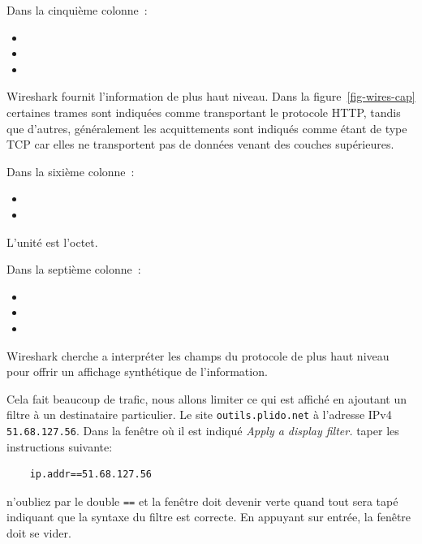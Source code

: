 {Dans la cinquième colonne~:
 \begin{itemize}[label=$\circ$]
   \item {}
   \item {}
   \item {}
  \end{itemize}
}
{
Wireshark fournit l'information de plus haut niveau. Dans la figure~\vref{fig-wires-cap} certaines trames sont indiquées comme transportant le protocole HTTP, tandis que d'autres, généralement les acquittements sont indiqués comme étant de type TCP car elles ne transportent pas de données venant des couches supérieures.
}
{Dans la sixième colonne~:
 \begin{itemize}[label=$\circ$]
   \item {}
   \item {}
  \end{itemize}
}
{
L'unité est l'octet.
}
{Dans la septième colonne~:
 \begin{itemize}[label=$\circ$]
   \item {}
   \item {}
   \item {}
  \end{itemize}
}
{
Wireshark cherche a interpréter les champs du protocole de plus haut niveau pour offrir un affichage synthétique de l'information.}
  \vspace{1em}

Cela fait beaucoup de trafic, nous allons limiter ce qui est affiché en ajoutant un filtre à un destinataire particulier. Le site \texttt{outils.plido.net} à l'adresse IPv4 \texttt{51.68.127.56}. Dans la fenêtre où il est indiqué \textit{Apply a display filter.} taper les instructions suivante: 

\begin{verbatim}
    ip.addr==51.68.127.56
\end{verbatim}

\noindent n'oubliez par le double \texttt{==} et la fenêtre doit devenir verte quand tout sera tapé indiquant que la syntaxe du filtre est correcte. En appuyant sur entrée, la fenêtre doit se vider.

